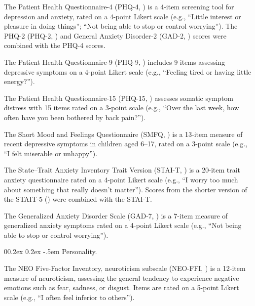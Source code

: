 \documentclass[
  jou,
  floatsintext,
  longtable,
  nolmodern,
  notxfonts,
  notimes,
  colorlinks=true,linkcolor=blue,citecolor=blue,urlcolor=blue]{apa7}
\makeatletter
\renewcommand{\paragraph}{\@startsection{paragraph}{4}{\parindent}%
	{0\baselineskip \@plus 0.2ex \@minus 0.2ex}%
	{-.5em}%
	{\normalfont\normalsize\bfseries\typesectitle}}
\makeatother
\begin{document}
The Patient Health Questionnaire-4 (PHQ-4,
) is a 4-item
screening tool for depression and anxiety, rated on a 4-point Likert
scale (e.g., ``Little interest or pleasure in doing things''; ``Not
being able to stop or control worrying''). The PHQ-2 (PHQ-2,
) and General
Anxiety Disorder-2 (GAD-2, ) scores were combined with the PHQ-4 scores.

The Patient Health Questionnaire-9 (PHQ-9,
) includes 9 items
assessing depressive symptoms on a 4-point Likert scale (e.g., ``Feeling
tired or having little energy?'').

The Patient Health Questionnaire-15 (PHQ-15,
) assesses somatic
symptom distress with 15 items rated on a 3-point scale (e.g., ``Over
the last week, how often have you been bothered by back pain?'').

The Short Mood and Feelings Questionnaire (SMFQ,
) is a 13-item
measure of recent depressive symptoms in children aged 6--17, rated on a
3-point scale (e.g., ``I felt miserable or unhappy'').

The State--Trait Anxiety Inventory Trait Version (STAI-T,
) is a 20-item
trait anxiety questionnaire rated on a 4-point Likert scale (e.g., ``I
worry too much about something that really doesn't matter''). Scores
from the shorter version of the STAIT-5
() were combined
with the STAI-T.

The Generalized Anxiety Disorder Scale (GAD-7,
) is a 7-item
measure of generalized anxiety symptoms rated on a 4-point Likert scale
(e.g., ``Not being able to stop or control worrying'').

\paragraph{Personality.}\label{personality}

The NEO Five-Factor Inventory, neuroticism subscale (NEO-FFI,
) is a 12-item measure
of neuroticism, assessing the general tendency to experience negative
emotions such as fear, sadness, or disgust. Items are rated on a 5-point
Likert scale (e.g., ``I often feel inferior to others'').
\end{document}
